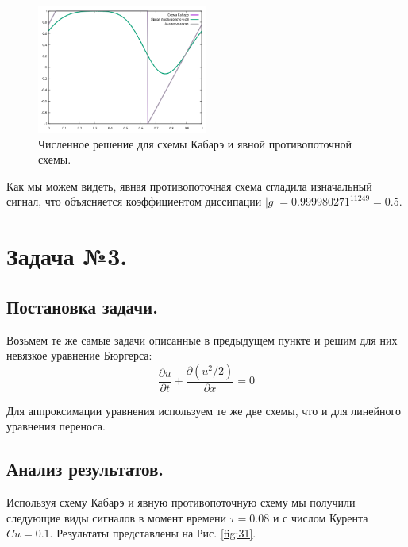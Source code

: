 \begin{figure}[H]
    \centering
    \includegraphics[width=0.5\textwidth]{images/22.png}
    \caption{Численное решение для схемы Кабарэ и явной противопоточной схемы.}
    \label{fig:21}
\end{figure}
Как мы можем видеть, явная противопоточная схема сгладила изначальный сигнал, что объясняется коэффициентом диссипации $|g|=0.999980271^{11249}=0.5$.

\section{Задача №3.}
\subsection{Постановка задачи.}
Возьмем те же самые задачи описанные в предыдущем пункте и решим для них невязкое уравнение Бюргерса:
\begin{equation}
    \frac{\partial u}{\partial t}+\frac{\partial (u^2/2)}{\partial x}=0
\end{equation}

Для аппроксимации уравнения используем те же две схемы, что и для линейного уравнения переноса.

\subsection{Анализ результатов.}
Используя схему Кабарэ и явную противопоточную схему мы получили следующие виды сигналов в момент времени $\tau=0.08$ и с числом Курента $Cu=0.1$. Результаты представлены на Рис. \ref{fig:31}.

